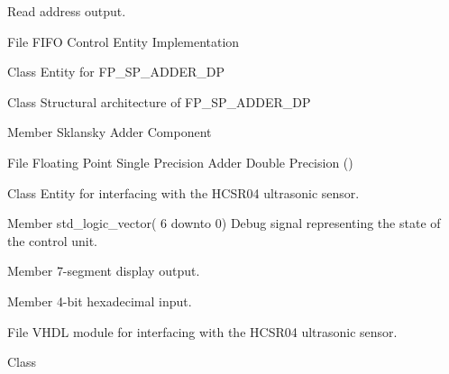 \begin{DoxyRefList}
%
 Read address output.  
\item[File \doxylink{fifo__ctrl_8vhdl}{fifo\+\_\+ctrl.vhdl} ]\label{brief__brief000030}%
%
 FIFO Control Entity Implementation 
\item[Class \doxylink{classfp__sp__adder__dp}{fp\+\_\+sp\+\_\+adder\+\_\+dp} ]\label{brief__brief000046}%
%
 Entity for FP\+\_\+\+SP\+\_\+\+ADDER\+\_\+\+DP 
\item[Class \doxylink{classfp__sp__adder__dp_1_1structural}{fp\+\_\+sp\+\_\+adder\+\_\+dp.structural} ]\label{brief__brief000047}%
%
 Structural architecture of FP\+\_\+\+SP\+\_\+\+ADDER\+\_\+\+DP 
\item[Member \doxylink{classfp__sp__adder__dp_1_1structural_a61bb95b7aff675edd529b4109382862f}{fp\+\_\+sp\+\_\+adder\+\_\+dp.structural.sklansky\+\_\+adder} ]\label{brief__brief000048}%
%
 Sklansky Adder Component 
\item[File \doxylink{fp__sp__adder__dp_8vhdl}{fp\+\_\+sp\+\_\+adder\+\_\+dp.vhdl} ]\label{brief__brief000045}%
%
 Floating Point Single Precision Adder Double Precision () 
\item[Class \doxylink{classhcsr04}{hcsr04} ]\label{brief__brief000090}%
%
 Entity for interfacing with the HCSR04 ultrasonic sensor.  
\item[Member \doxylink{classhcsr04_a3e54dae1b6039ba2a8b11c22d8da7b34}{hcsr04.db\+\_\+estado} std\+\_\+logic\+\_\+vector( 6 downto  0) ]\label{brief__brief000091}%
%
 Debug signal representing the state of the control unit.  
\item[Member \doxylink{classhcsr04_1_1structural_ab6f0cbc00f845983e264a9e29cdd3091}{hcsr04.structural.hcsr04\+\_\+interface} ]\label{brief__brief000093}%
%
 7-\/segment display output.  
\item[Member \doxylink{classhcsr04_1_1structural_aa5b74bab2ae2cf05d2545639786dd91c}{hcsr04.structural.hexa7seg} ]\label{brief__brief000092}%
%
 4-\/bit hexadecimal input.  
\item[File \doxylink{hcsr04_8vhdl}{hcsr04.vhdl} ]\label{brief__brief000089}%
%
 VHDL module for interfacing with the HCSR04 ultrasonic sensor.  
\item[Class \doxylink{classhcsr04__ctrl}{hcsr04\+\_\+ctrl} ]\label{brief__brief000095}%

\end{DoxyRefList}
